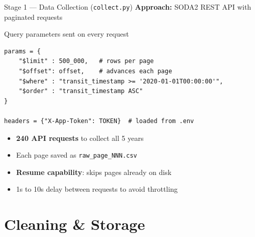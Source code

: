 \documentclass{beamer}
\begin{document}
	\begin{frame}[fragile]{Stage 1 — Data Collection (\texttt{collect.py})}
		\textbf{Approach:} SODA2 REST API with paginated requests\\
		\vspace{0.3cm}
		\begin{block}{Query parameters sent on every request}
			\begin{lstlisting}[style=pysmall]
params = {
	"$limit" : 500_000,   # rows per page
	"$offset": offset,    # advances each page
	"$where" : "transit_timestamp >= '2020-01-01T00:00:00'",
	"$order" : "transit_timestamp ASC"
}

headers = {"X-App-Token": TOKEN}  # loaded from .env
			\end{lstlisting}
		\end{block}
		\vspace{0.2cm}
		\begin{itemize}
			\item \textbf{240 API requests} to collect all 5 years
			\item Each page saved as \texttt{raw\_page\_NNN.csv}
			\item \textbf{Resume capability}: skips pages already on disk
			\item 1s to 10s delay between requests to avoid throttling
		\end{itemize}
	\end{frame}
	
	\section{Cleaning \& Storage}
	
\end{document}
